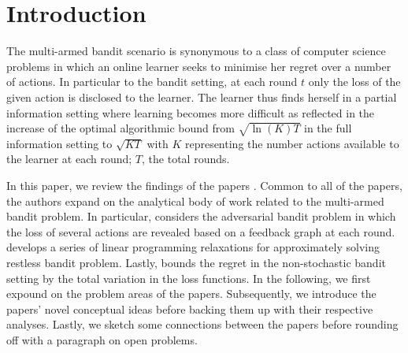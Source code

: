 \section{Introduction}

The multi-armed bandit scenario is synonymous to a class of computer science problems in which an online learner seeks to minimise her regret over a number of actions. In particular to the bandit setting, at each round $t$ only the loss of the given action is disclosed to the learner. The learner thus finds herself in a partial information setting where learning becomes more difficult as reflected in the increase of the optimal algorithmic bound from $\sqrt{\ln(K)T}$ in the full information setting to $\sqrt{KT}$ with $K$ representing the number actions available to the learner at each round; $T$, the total rounds. 

In this paper, we review the findings of the papers \citep{alon, hazan, bertsimas}. Common to all of the papers, the authors expand on the analytical body of work related to the multi-armed bandit problem. In particular, \citep{alon} considers the adversarial bandit problem in which the loss of several actions are revealed based on a feedback graph at each round. \citep{hazan} develops a series of linear programming relaxations for approximately solving restless bandit problem. Lastly, \citep{bertsimas} bounds the regret in the non-stochastic bandit setting by the total variation in the loss functions. In the following, we first expound on the problem areas of the papers. Subsequently, we introduce the papers' novel conceptual ideas before backing them up with their respective analyses. Lastly, we sketch some connections between the papers before rounding off with a paragraph on open problems.
